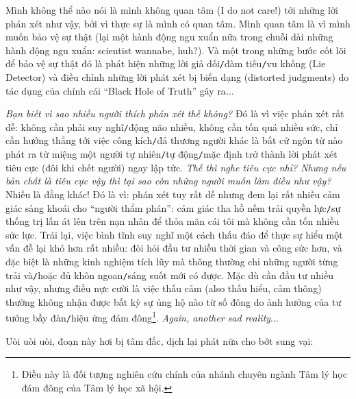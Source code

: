 \documentclass[12pt]{article}
\numberwithin{equation}{section}
\begin{document}
Mình không thể nào nói là mình không quan tâm (I do not care!) tới những lời phán xét như vậy, bởi vì thực sự là mình có quan tâm. Mình quan tâm là vì mình muốn bảo vệ sự thật (lại một hành động ngu xuẩn nữa trong chuỗi dài những hành động ngu xuẩn: scientist wannabe, huh?). Và một trong những bước cốt lõi để bảo vệ sự thật đó là phát hiện những lời giả dối\texttt{/}đàm tiếu\texttt{/}vu khống (Lie Detector) và điều chỉnh những lời phát xét bị biến dạng (distorted judgments) do tác dụng của chính cái ``Black Hole of Truth'' gây ra$\ldots$

\textit{Bạn biết vì sao nhiều người thích phán xét thế không?} Đó là vì việc phán xét rất dễ: không cần phải suy nghĩ\texttt{/}động não nhiều, không cần tốn quá nhiều sức, chỉ cần hướng thẳng tới việc công kích\texttt{/}đả thương người khác là bất cứ ngôn từ nào phát ra từ miệng một người tự nhiên\texttt{/}tự động\texttt{/}mặc định trở thành lời phát xét tiêu cực (đôi khi chết người) ngay lập tức. \textit{Thế thì nghe tiêu cực nhỉ? Nhưng nếu bản chất là tiêu cực vậy thì tại sao còn những người muốn làm điều như vậy?} Nhiều là đằng khác! Đó là vì: phán xét tuy rất dễ nhưng đem lại rất nhiều cảm giác sảng khoái cho ``người thẩm phán'': cảm giác tha hồ nếm trải quyền lực\texttt{/}sự thống trị  lấn át lên trên nạn nhân để thỏa mãn cái tôi mà không cần tốn nhiều sức lực. Trái lại, việc bình tĩnh suy nghĩ một cách thấu đáo để thực sự hiểu một vấn đề lại khó hơn rất nhiều: đòi hỏi đầu tư nhiều thời gian và công sức hơn, và đặc biệt là những kinh nghiệm tích lũy mà thông thường chỉ những người từng trải và\texttt{/}hoặc đủ khôn ngoan\texttt{/}sáng suốt mới có được. Mặc dù cần đầu tư nhiều như vậy, nhưng điều nực cười là việc thấu cảm (also thấu hiểu, cảm thông) thường không nhận được bất kỳ sự ủng hộ nào từ số đông do ảnh hưởng của tư tưởng bầy đàn\texttt{/}hiệu ứng đám đông\footnote{Điều này là đối tượng nghiên cứu chính của nhánh chuyên ngành Tâm lý học đám đông của Tâm lý học xã hội.}. \textit{Again, another sad reality}$\ldots$

Uòi uòi uòi, đoạn này hơi bị tâm đắc, dịch lại phát nữa cho bớt sung vại:
\end{document}
